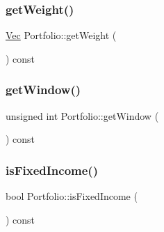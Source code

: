 \hypertarget{classPortfolio_a93c955e745cf06b58f1ce7c7e6fe41e5}{}\label{classPortfolio_a93c955e745cf06b58f1ce7c7e6fe41e5} 
\subsubsection{\texorpdfstring{get\+Weight()}{getWeight()}}
{\footnotesize\ttfamily \hyperlink{compute__returns__eigen_8h_a1eb6a9306ef406d7975f3cbf2e247777}{Vec} Portfolio\+::get\+Weight (\begin{DoxyParamCaption}{ }\end{DoxyParamCaption}) const\hspace{0.3cm}{\ttfamily [inline]}}

\hypertarget{classPortfolio_a3d2bbcfa8f794d8fefad630abefdce7b}{}\label{classPortfolio_a3d2bbcfa8f794d8fefad630abefdce7b} 
\subsubsection{\texorpdfstring{get\+Window()}{getWindow()}}
{\footnotesize\ttfamily unsigned int Portfolio\+::get\+Window (\begin{DoxyParamCaption}{ }\end{DoxyParamCaption}) const\hspace{0.3cm}{\ttfamily [inline]}}

\hypertarget{classPortfolio_acdfc56639cad8ed648780d81f066d760}{}\label{classPortfolio_acdfc56639cad8ed648780d81f066d760} 
\subsubsection{\texorpdfstring{is\+Fixed\+Income()}{isFixedIncome()}}
{\footnotesize\ttfamily bool Portfolio\+::is\+Fixed\+Income (\begin{DoxyParamCaption}{ }\end{DoxyParamCaption}) const\hspace{0.3cm}{\ttfamily [inline]}}

\hypertarget{classPortfolio_a9458c66e10d7a6b8c037ad3584a1e70c}{}\label{classPortfolio_a9458c66e10d7a6b8c037ad3584a1e70c} 
